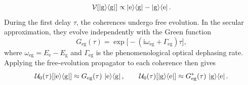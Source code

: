 \begin{equation}
	\mathcal{V}[\ket{\mathrm{g}}\!\bra{\mathrm{g}}]
	\propto \ket{\mathrm{e}}\!\bra{\mathrm{g}} - \ket{\mathrm{g}}\!\bra{\mathrm{e}}.
	\label{eq:spctr_S1_commutator_expanded}
\end{equation}
During the first delay $\tau$, the coherences undergo free evolution.
In the secular approximation, they evolve independently with the Green function
\begin{equation}
	G_{\mathrm{eg}}(\tau) = \exp\bigl[-(\mathrm{i}\omega_{\mathrm{eg}}+\Gamma_{\mathrm{eg}})\tau\bigr],
	\label{eq:spctr_Green_function_two_level}
\end{equation}
where $\omega_{\mathrm{eg}}=E_{\mathrm{e}}-E_{\mathrm{g}}$ and $\Gamma_{\mathrm{eg}}$ is the phenomenological optical dephasing rate. Applying the free-evolution propagator to each coherence then gives
\begin{equation*}
    \mathcal{U}_0(\tau)[\ket{\mathrm{e}}\!\bra{\mathrm{g}}]\approx G_{\mathrm{eg}}(\tau)\,\ket{\mathrm{e}}\!\bra{\mathrm{g}},
    \qquad
    \mathcal{U}_0(\tau)[\ket{\mathrm{g}}\!\bra{\mathrm{e}}]\approx G_{\mathrm{eg}}^*(\tau)\,\ket{\mathrm{g}}\!\bra{\mathrm{e}}.
\end{equation*}

